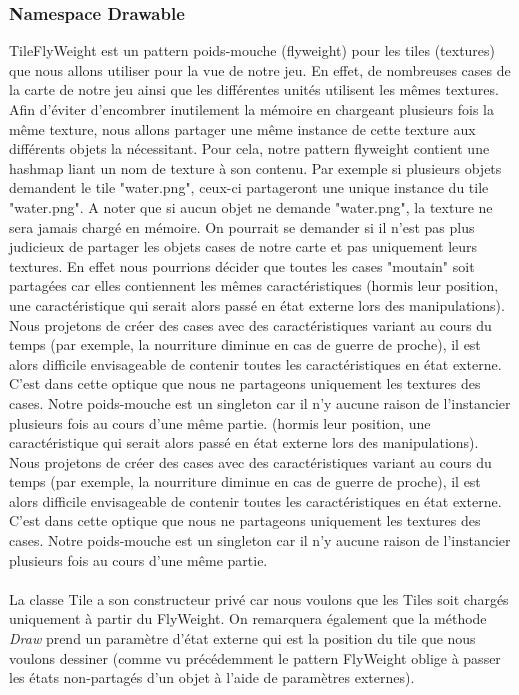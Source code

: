 		\subsubsection{Namespace Drawable} 
			TileFlyWeight est un pattern poids-mouche (flyweight) pour les tiles (textures) que nous allons utiliser pour la vue de notre jeu.
		En effet, de nombreuses cases de la carte de notre jeu ainsi que les différentes unités utilisent les mêmes textures. Afin d'éviter d'encombrer
		inutilement la mémoire en chargeant plusieurs fois la même texture, nous allons partager une même instance de cette texture aux différents objets la nécessitant.
		Pour cela, notre pattern flyweight contient une hashmap liant un nom de texture à son contenu. 
		Par exemple si plusieurs objets demandent le tile "water.png", ceux-ci partageront une unique instance du tile "water.png". 
		A noter que si aucun objet ne demande "water.png", la texture ne sera jamais chargé en mémoire.
			On pourrait se demander si il n'est pas plus judicieux de partager les objets cases de notre carte et pas uniquement leurs textures. 
		En effet nous pourrions décider que toutes les cases "moutain" soit partagées car elles contiennent les mêmes caractéristiques 
		(hormis leur position, une caractéristique qui serait alors passé en état externe lors des manipulations).
			Nous projetons de créer des cases avec des caractéristiques variant au cours du temps (par exemple, la nourriture diminue en cas de guerre de proche), 
		il est alors difficile envisageable de contenir toutes les caractéristiques en état externe. C'est dans cette optique que nous ne partageons uniquement les textures des cases.
		Notre poids-mouche est un singleton car il n'y aucune raison de l'instancier plusieurs fois au cours d'une même partie.
		(hormis leur position, une caractéristique qui serait alors passé en état externe lors des manipulations).
			Nous projetons de créer des cases avec des caractéristiques variant au cours du temps (par exemple, la nourriture diminue en cas de guerre de proche), 
		il est alors difficile envisageable de contenir toutes les caractéristiques en état externe. C'est dans cette optique que nous ne partageons uniquement les textures des cases.
		Notre poids-mouche est un singleton car il n'y aucune raison de l'instancier plusieurs fois au cours d'une même partie.
		\paragraph{}
		La classe Tile a son constructeur privé car nous voulons que les Tiles soit chargés uniquement à partir du FlyWeight. 
		On remarquera également que la méthode \textit{Draw} prend un paramètre d'état externe qui est la position du tile que nous voulons dessiner 
		(comme vu précédemment le pattern FlyWeight oblige à passer les états non-partagés d'un objet à l'aide de paramètres externes).
